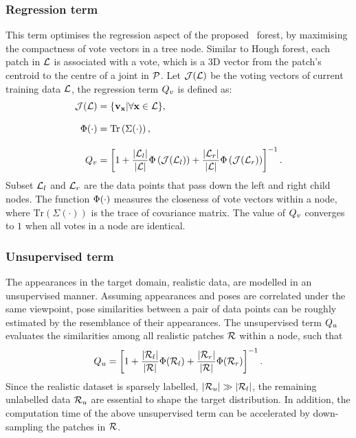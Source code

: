 \subsubsection{Regression term} 
This term optimises the regression aspect of the proposed \STR\ forest, by maximising the compactness of vote vectors in a tree node.  
Similar to Hough forest, each patch in $\mathcal{L}$ is associated with a vote, which is a 3D vector from the patch's centroid to the centre of a joint in $\mathcal{P}$. Let $\mathcal{J}(\mathcal{L})$ be the voting vectors of current training data $\mathcal{L}$, the regression term $Q_{v}$ is defined as: 
\begin{equation}
	\begin{aligned}
		\mathcal{J}(\mathcal{L}) & = \{ \mathbf{v}_{\mathbf{x}}|\forall \mathbf{x} \in \mathcal{L} \},\\[3mm]
		\mathrm{\Phi}(\cdot) & = \mathrm{Tr}\left(\Sigma(\cdot)\right),\\[3mm] 
	Q_{v} & = \left[ 1 + 
		\frac{|\mathcal{L}_{l}|}{|\mathcal{L}|} \mathrm{\Phi}\left(\mathcal{J}(\mathcal{L}_{l})\right) +  
	\frac{|\mathcal{L}_{r}|}{|\mathcal{L}|} \mathrm{\Phi}\left(\mathcal{J}(\mathcal{L}_{r})\right) \right]^{-1}.
	\end{aligned}
	\label{eqn/hand/regterm}
\end{equation}
Subset $\mathcal{L}_{l}$ and $\mathcal{L}_{r}$ are the data points that pass down the left and right child nodes. The function $\mathrm{\Phi}(\cdot)$ measures the closeness of vote vectors within a node, where $\mathrm{Tr}(\Sigma(\cdot))$ is the trace of covariance matrix. The value of $Q_{v}$ converges to $1$ when all votes in a node are identical. 

\subsubsection{Unsupervised term} 
The appearances in the target domain, \ie realistic data, are modelled in an unsupervised manner.
Assuming appearances and poses are correlated under the same viewpoint, pose similarities between a pair of data points can be roughly estimated by the resemblance of their appearances. The unsupervised term $Q_{u}$ evaluates the similarities among all realistic patches $\mathcal{R}$ within a node, such that 
\begin{equation}
	Q_{u} = \left[ 1 + 
		\frac{|\mathcal{R}_{l}|}{|\mathcal{R}|} \mathrm{\Phi}(\mathcal{R}_{l}) +  
	\frac{|\mathcal{R}_{r}|}{|\mathcal{R}|} \mathrm{\Phi}(\mathcal{R}_{r}) \right]^{-1}.
	\label{eqn/hand/usterm}
\end{equation}
Since the realistic dataset is sparsely labelled, \ie $|\mathcal{R}_{u}| \gg |\mathcal{R}_{l}|$, the remaining unlabelled data $\mathcal{R}_{u}$ are essential to shape the target distribution. In addition, the computation time of the above unsupervised term can be accelerated by down-sampling the patches in $\mathcal{R}$.  

